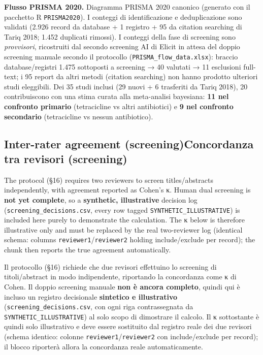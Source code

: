 \documentclass[
  letterpaper,
  DIV=11,
  numbers=noendperiod]{scrartcl}
\begin{document}
\textbf{Flusso PRISMA 2020.} Diagramma PRISMA 2020 canonico (generato
con il pacchetto R \texttt{PRISMA2020}). I conteggi di identificazione e
deduplicazione sono validati (2.926 record da database + 1 registro + 95
da citation searching di Tariq 2018; 1.452 duplicati rimossi). I
conteggi della fase di screening sono \emph{provvisori}, ricostruiti dal
secondo screening AI di Elicit in attesa del doppio screening manuale
secondo il protocollo (\texttt{PRISMA\_flow\_data.xlsx}): braccio
database/registri 1.475 sottoposti a screening → 40 valutati → 11
esclusioni full-text; i 95 report da altri metodi (citation searching)
non hanno prodotto ulteriori studi eleggibili. Dei 35 studi inclusi (29
nuovi + 6 trasferiti da Tariq 2018), 20 contribuiscono con una stima
curata alla meta-analisi bayesiana: \textbf{11 nel confronto primario}
(tetracicline vs altri antibiotici) e \textbf{9 nel confronto
secondario} (tetracicline vs nessun antibiotico).

\subsection{\texorpdfstring{{Inter-rater agreement
(screening)}{Concordanza tra revisori
(screening)}}{Inter-rater agreement (screening)Concordanza tra revisori (screening)}}\label{inter-rater-agreement-screeningconcordanza-tra-revisori-screening}

The protocol (§16) requires two reviewers to screen titles/abstracts
independently, with agreement reported as Cohen's κ. Human dual
screening is \textbf{not yet complete}, so a \textbf{synthetic,
illustrative} decision log (\texttt{screening\_decisions.csv}, every row
tagged \texttt{SYNTHETIC\_ILLUSTRATIVE}) is included here purely to
demonstrate the calculation. The κ below is therefore illustrative only
and must be replaced by the real two-reviewer log (identical schema:
columns \texttt{reviewer1}/\texttt{reviewer2} holding include/exclude
per record); the chunk then reports the true agreement automatically.

Il protocollo (§16) richiede che due revisori effettuino lo screening di
titoli/abstract in modo indipendente, riportando la concordanza come κ
di Cohen. Il doppio screening manuale \textbf{non è ancora completo},
quindi qui è incluso un registro decisionale \textbf{sintetico e
illustrativo} (\texttt{screening\_decisions.csv}, con ogni riga
contrassegnata da \texttt{SYNTHETIC\_ILLUSTRATIVE}) al solo scopo di
dimostrare il calcolo. Il κ sottostante è quindi solo illustrativo e
deve essere sostituito dal registro reale dei due revisori (schema
identico: colonne \texttt{reviewer1}/\texttt{reviewer2} con
include/exclude per record); il blocco riporterà allora la concordanza
reale automaticamente.
\end{document}
